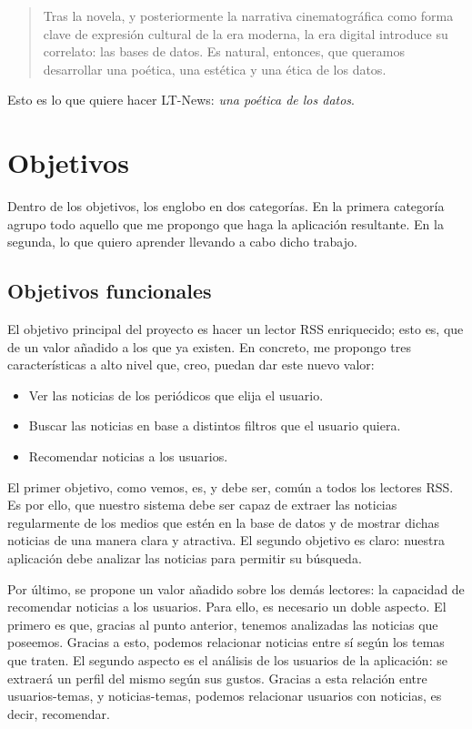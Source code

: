 	\begin{quote}
		\small Tras la novela, y posteriormente la narrativa cinematográfica como forma clave de expresión cultural de la era moderna, la era digital introduce su correlato: las bases de datos. Es natural, entonces, que queramos desarrollar una poética, una estética y una ética de los datos.
		\begin{flushright}
		\end{flushright}
	\end{quote}

Esto es lo que quiere hacer LT-News: \emph{una poética de los datos}.


\section{Objetivos}\label{sec:objetivos}

Dentro de los objetivos, los englobo en dos categorías. En la primera categoría agrupo todo aquello que me propongo que haga la aplicación resultante. En la segunda, lo que quiero aprender llevando a cabo dicho trabajo.

\subsection{Objetivos funcionales}

El objetivo principal del proyecto es hacer un lector RSS enriquecido; esto es, que de un valor añadido a los que ya existen. En concreto, me propongo tres características a alto nivel que, creo, puedan dar este nuevo valor:

\begin{itemize}
	\item Ver las noticias de los periódicos que elija el usuario.
	\item Buscar las noticias en base a distintos filtros que el usuario quiera.
	\item Recomendar noticias a los usuarios.
\end{itemize}

El primer objetivo, como vemos, es, y debe ser, común a todos los lectores RSS. Es por ello, que nuestro sistema debe ser capaz de extraer las noticias regularmente de los medios que estén en la base de datos y de mostrar dichas noticias de una manera clara y atractiva. El segundo objetivo es claro: nuestra aplicación debe analizar las noticias para permitir su búsqueda.

Por último, se propone un valor añadido sobre los demás lectores: la capacidad de recomendar noticias a los usuarios. Para ello, es necesario un doble aspecto. El primero es que, gracias al punto anterior, tenemos analizadas las noticias que poseemos. Gracias a esto, podemos relacionar noticias entre sí según los temas que traten. El segundo aspecto es el análisis de los usuarios de la aplicación: se extraerá un perfil del mismo según sus gustos. Gracias a esta relación entre usuarios-temas, y noticias-temas, podemos relacionar usuarios con noticias, es decir, recomendar.

